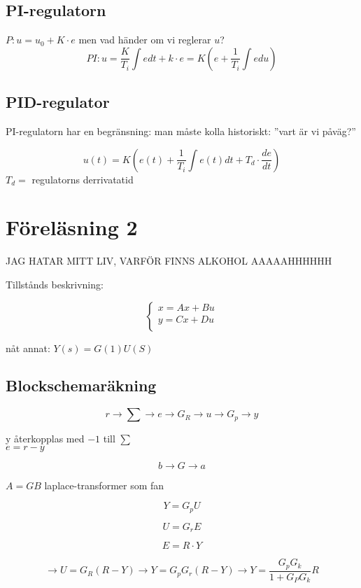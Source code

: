 \documentclass[12pt]{article} %
\begin{document}
\subsection{PI-regulatorn}
$P: u = u_0 + K \cdot e$ men vad händer om vi reglerar $u$?
\[
    PI: u=\dfrac{K}{T_i}\int edt + k \cdot e = K(e + \dfrac{1}{T_i} \int edu)
\]

\subsection{PID-regulator}
PI-regulatorn har en begränsning: man måste kolla historiskt: ''vart är vi påväg?''

\[
    u(t) = K(e(t) + \dfrac{1}{T_i} \int e(t) dt + T_d \cdot \dfrac{de}{dt})
\] 
$T_d =$ regulatorns derrivatatid


\section{Föreläsning 2}

JAG HATAR MITT LIV, VARFÖR FINNS ALKOHOL AAAAAHHHHHH

Tillstånds beskrivning: 

\[
    \begin{cases}
        x = Ax + Bu \\
        y = Cx + Du \\
    \end{cases}
\]

nåt annat: $Y(s) = G(1)U(S)$

\subsection{Blockschemaräkning}

\[
    r \rightarrow \sum \rightarrow e \rightarrow G_R \rightarrow u \rightarrow G_p \rightarrow y
\]

y återkopplas med $-1$ till $\sum$ \\

$e = r - y$

\[
    b \rightarrow G \rightarrow a
\]


$A = GB$
laplace-transformer som fan

\[
    Y = G_p U
\]

\[
    U = G_r E
\]

\[
    E = R \cdot Y
\]

\[
    \rightarrow U = G_R (R -Y) \rightarrow Y = G_p G_r (R-Y) \rightarrow Y = \frac{G_p G_k}{1 + G_P G_k}R
\]
\end{document}
